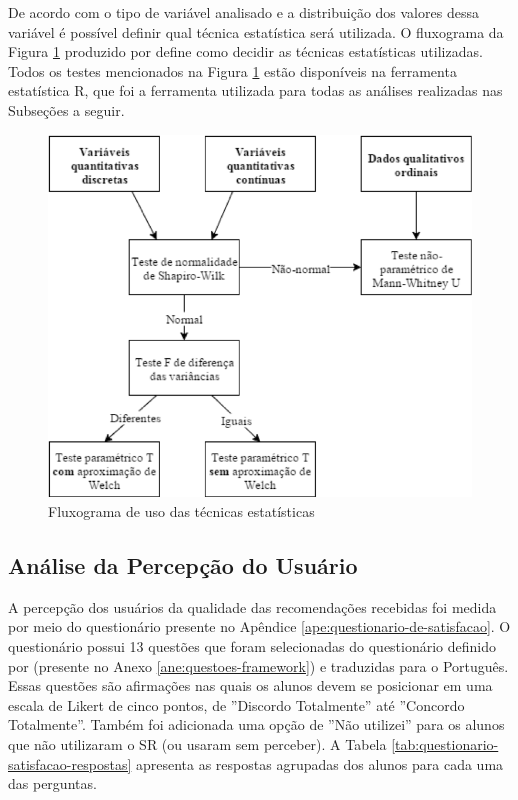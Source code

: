 De acordo com o tipo de variável analisado e a distribuição dos valores dessa variável é possível definir qual técnica
estatística será utilizada. O fluxograma da Figura \ref{fig:fluxograma-tecnica-moissa} produzido por 
define como decidir as técnicas estatísticas utilizadas. Todos os testes mencionados na Figura \ref{fig:fluxograma-tecnica-moissa}
estão disponíveis na ferramenta estatística R, que foi a ferramenta utilizada para todas as análises realizadas nas
Subseções a seguir.

\begin{figure}[htb]
  \caption{\label{fig:fluxograma-tecnica-moissa}Fluxograma de uso das técnicas estatísticas}
  \begin{center}
      \includegraphics[scale=1.0]{./Figuras/fluxograma-tecnicas-moissa.png}
  \end{center}
\end{figure}

\subsection{Análise da Percepção do Usuário}\label{subsection:analise-questionario-satisfacao}

A percepção dos usuários da qualidade das recomendações recebidas foi medida por meio do questionário presente no
Apêndice \ref{ape:questionario-de-satisfacao}. O questionário possui 13 questões que foram selecionadas do questionário
definido por  (presente no Anexo \ref{ane:questoes-framework}) e traduzidas para o Português.
Essas questões são afirmações nas quais os alunos devem se posicionar em uma escala de
Likert de cinco pontos, de ''Discordo Totalmente'' até ''Concordo Totalmente''. Também foi adicionada uma opção de ''Não utilizei'' para
os alunos que não utilizaram o SR (ou usaram sem perceber). A Tabela \ref{tab:questionario-satisfacao-respostas}
apresenta as respostas agrupadas dos alunos para cada uma das perguntas.

